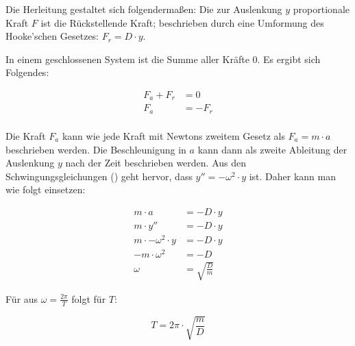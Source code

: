 Die Herleitung gestaltet sich folgendermaßen: Die zur Auslenkung $y$ proportionale Kraft $F$ ist die Rückstellende Kraft; beschrieben durch eine Umformung des Hooke'schen Gesetzes: $F_{r}=D \cdot y$. 

In einem geschlossenen System ist die Summe aller Kräfte $0$. Es ergibt sich Folgendes:

\begin{align*}
	F_a + F_r &= 0 \\
	F_a &= -F_r \\
\end{align*}

Die Kraft $F_a$ kann wie jede Kraft mit Newtons zweitem Gesetz als $F_a=m \cdot a$ beschrieben werden. Die Beschleunigung in $a$ kann dann als zweite Ableitung der Auslenkung $y$ nach der Zeit beschrieben werden. Aus den Schwingungsgleichungen () geht hervor, dass $y''=-\omega^{2} \cdot y$ ist. Daher kann man wie folgt einsetzen:

\begin{align*}
	m \cdot a &= -D \cdot y \\
	m \cdot y'' &= -D \cdot y \\
	m \cdot -\omega^{2} \cdot y &= -D \cdot y \\
	- m \cdot \omega^{2} &= -D \\
	\omega &= \sqrt{\frac{D}{m}}
\end{align*}

Für aus $\omega=\frac{2\pi}{T}$ folgt für $T$:

\begin{equation*}
	T = 2\pi \cdot \sqrt{\frac{m}{D}}
\end{equation*}

